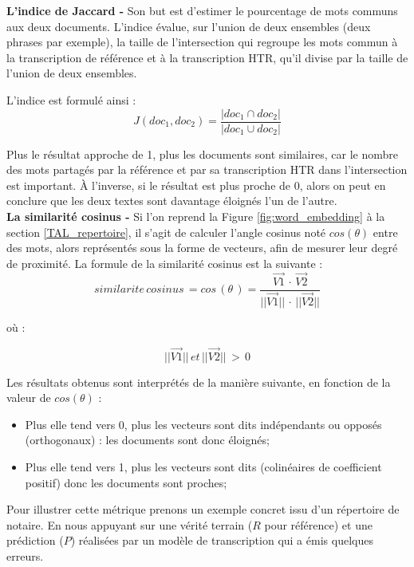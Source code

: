 \textbf{L'indice de Jaccard -} Son but est d'estimer le pourcentage de mots communs aux deux documents. L'indice évalue, sur l'union de deux ensembles (deux phrases par exemple), la taille de l'intersection qui regroupe les mots commun à la transcription de référence et à la transcription HTR, qu'il divise par la taille de l'union de deux ensembles.

L'indice est formulé ainsi : $$ J(doc_1,doc_2) = \frac{|doc_1 \cap doc_2|}{|doc_1 \cup doc_2|} $$

Plus le résultat approche de 1, plus les documents sont similaires, car le nombre des mots partagés par la référence et par sa transcription HTR dans l'intersection est important. À l'inverse, si le résultat est plus proche de 0, alors on peut en conclure que les deux textes sont davantage éloignés l'un de l'autre.\\

\textbf{La similarité cosinus -} Si l'on reprend la Figure \ref{fig:word_embedding} à la section \ref{TAL_repertoire}, il s'agit de calculer l'angle cosinus noté $cos(\theta)$ entre des mots, alors représentés sous la forme de vecteurs, afin de mesurer leur degré de proximité. La formule de la similarité cosinus est la suivante : $$ similarite\, cosinus \, = cos\, (\theta\,) = \frac{\overrightarrow{V1}\, \cdot \,\overrightarrow{V2}}{||\overrightarrow{V1}||\, \cdot \,||\overrightarrow{V2}||} $$

où : 

$$ ||\overrightarrow{V1}||\, et\, ||\overrightarrow{V2}||\, >\, 0 $$

Les résultats obtenus sont interprétés de la manière suivante, en fonction de la valeur de $cos(\theta)$ :

\begin{itemize}
    \item Plus elle tend vers 0, plus les vecteurs sont dits indépendants ou opposés (orthogonaux) : les documents sont donc éloignés;
    \item Plus elle tend vers 1, plus les vecteurs sont dits (colinéaires de coefficient positif) donc les documents sont proches;
\end{itemize}

Pour illustrer cette métrique prenons un exemple concret issu d'un répertoire de notaire. En nous appuyant sur une vérité terrain ($R$ pour référence) et une prédiction ($P$) réalisées par un modèle de transcription qui a émis quelques erreurs.\\

